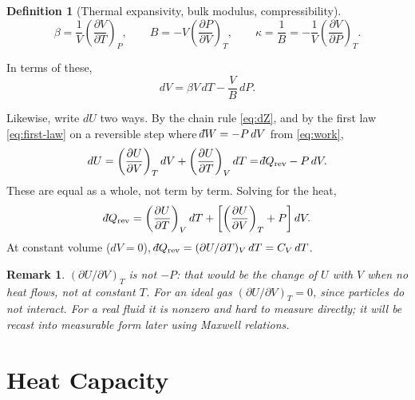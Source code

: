 \documentclass{article}
\newtheorem{definition}{Definition}
\newtheorem{remark}{Remark}
\newcommand{\dbar}{\mathchar'26\mkern-12mu d}
\begin{document}
\begin{definition}[Thermal expansivity, bulk modulus, compressibility]
    \begin{equation}
        \beta = \frac{1}{V}\left(\frac{\partial V}{\partial T}\right)_P, \qquad B = -V\left(\frac{\partial P}{\partial V}\right)_T, \qquad \kappa = \frac{1}{B} = -\frac{1}{V}\left(\frac{\partial V}{\partial P}\right)_T.
    \end{equation}
\end{definition}

In terms of these,
\begin{equation}
    dV = \beta V\,dT - \frac{V}{B}\,dP.
\end{equation}

Likewise, write $dU$ two ways. By the chain rule \eqref{eq:dZ}, and by the first law \eqref{eq:first-law} on a reversible step where $\dbar W = -P\,dV$ from \eqref{eq:work},
\[dU = \left(\frac{\partial U}{\partial V}\right)_T dV + \left(\frac{\partial U}{\partial T}\right)_V dT = \dbar Q_{\text{rev}} - P\,dV.\]
These are equal as a whole, not term by term. Solving for the heat,
\begin{equation}
    \label{eq:dQrev}
    \dbar Q_{\text{rev}} = \left(\frac{\partial U}{\partial T}\right)_V dT + \left[\left(\frac{\partial U}{\partial V}\right)_T + P\right] dV.
\end{equation}
At constant volume ($dV = 0$), $\dbar Q_{\text{rev}} = (\partial U/\partial T)_V\,dT = C_V\,dT$.

\begin{remark}
    $(\partial U/\partial V)_T$ is not $-P$: that would be the change of $U$ with $V$ when no heat flows, not at constant $T$. For an ideal gas $(\partial U/\partial V)_T = 0$, since particles do not interact. For a real fluid it is nonzero and hard to measure directly; it will be recast into measurable form later using Maxwell relations.
\end{remark}

\section{Heat Capacity}
\end{document}
